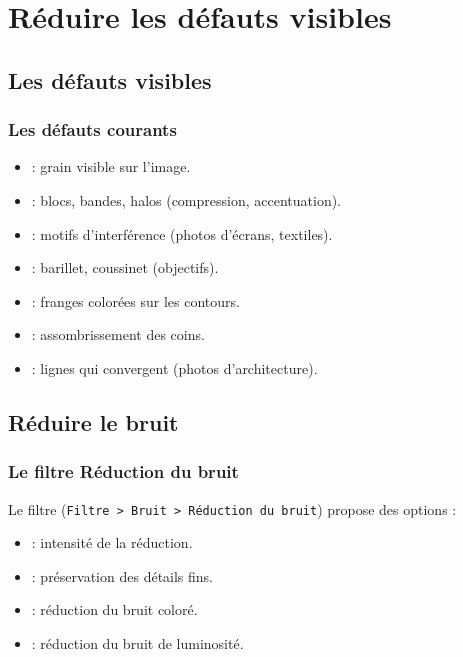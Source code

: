 \section{Réduire les défauts visibles}

\subsection{Les défauts visibles}

\subsubsection{Les défauts courants}

\begin{itemize}
    \item {} : grain visible sur l'image.
    \item {} : blocs, bandes, halos (compression, accentuation).
    \item {} : motifs d'interférence (photos d'écrans, textiles).
    \item {} : barillet, coussinet (objectifs).
    \item {} : franges colorées sur les contours.
    \item {} : assombrissement des coins.
    \item {} : lignes qui convergent (photos d'architecture).
\end{itemize}

\subsection{Réduire le bruit}

\subsubsection{Le filtre Réduction du bruit}

Le filtre  (\texttt{Filtre > Bruit > Réduction du bruit}) propose des options :

\begin{itemize}
    \item {} : intensité de la réduction.
    \item {} : préservation des détails fins.
    \item {} : réduction du bruit coloré.
    \item {} : réduction du bruit de luminosité.
\end{itemize}

